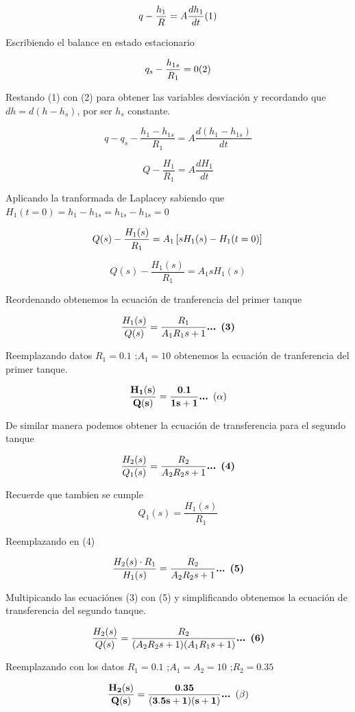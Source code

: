 \documentclass[
  letterpaper,
  DIV=11,
  numbers=noendperiod]{scrreprt}
\begin{document}
\[
q- \frac{h_1}{R} = A\frac{dh_1}{dt} \space\space\space\space (1)
\]

Escribiendo el balance en estado estacionario

\[
q_s- \frac{h_{1s}}{R_1} = 0 \space\space\space\space (2)
\]

Restando (1) con (2) para obtener las variables desviación y recordando
que \(dh=d(h-h_s)\), por ser \(h_s\) constante.

\[
q-q_s-\frac{h_1-h_{1s}}{R_1}=A\frac{d(h_1-h_{1s})}{dt}
\]

\[
Q - \frac{H_1}{R_1} = A\frac{dH_1}{dt}
\]

Aplicando la tranformada de Laplacey sabiendo que
\(H_1(t=0)= h_1-h_{1s}=h_{1s}-h_{1s}=0\)

\[
Q(s) - \frac{H_1(s)}{R_1} = A_1\left[sH_1(s)-H_1(t=0)\right]\\
\]

\[
Q(s) - \frac{H_1(s)}{R_1} = A_1sH_1(s)
\]

Reordenando obtenemos la ecuación de tranferencia del primer tanque

\[
\frac{H_1(s)}{Q(s)} = \frac{R_1}{A_1R_1s+1}\space\space\space\space\textbf{... (3)}
\]

Reemplazando datos \(R_1=0.1\text{   ;}A_1=10\) obtenemos la ecuación de
tranferencia del primer tanque.

\[
\mathbf{\frac{H_1(s)}{Q(s)} = \frac{0.1}{1s+1}} \space\space\space\space\textbf{... }\mathbf{(\alpha)}
\]

De similar manera podemos obtener la ecuación de transferencia para el
segundo tanque

\[
\frac{H_2(s)}{Q_1(s)} = \frac{R_2}{A_2R_2s+1}\space\space\space\space\textbf{... (4)}
\]

Recuerde que tambien se cumple \[
Q_1(s)=\frac{H_1(s)}{R_1}
\]

Reemplazando en (4)

\[
\frac{H_2(s)\cdot R_1}{H_1(s)} = \frac{R_2}{A_2R_2s+1}\space\space\space\space\textbf{... (5)}
\]

Multipicando las ecuaciónes (3) con (5) y simplificando obtenemos la
ecuación de transferencia del segundo tanque.

\[
\frac{H_2(s)}{Q(s)} = \frac{R_2}{(A_2R_2s+1)(A_1R_1s+1)}\space\space\space\space\textbf{... (6)}
\]

Reemplazando con los datos
\(R_1=0.1\text{   ;}A_1=A_2=10\text{   ;}R_2=0.35\)

\[
\mathbf{\frac{H_2(s)}{Q(s)} = \frac{0.35}{(3.5s+1)(s+1)}} \space\space\space\space\textbf{... }\mathbf{(\beta)}
\]
\end{document}

